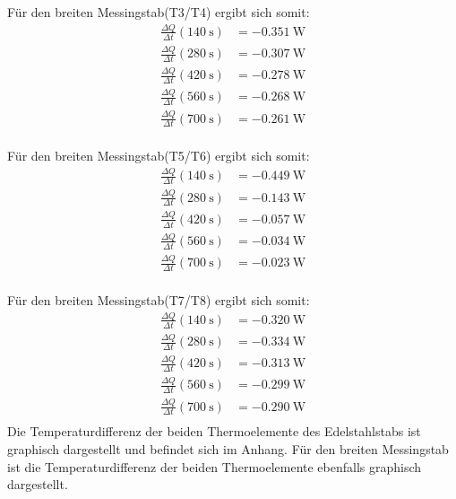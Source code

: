 Für den breiten Messingstab(T3/T4) ergibt sich somit:
\begin{align*} %
   \frac{\Delta Q}{\Delta t}(\SI{140}{\second}) &= \SI{-0.351}{\watt} \\ 
   \frac{\Delta Q}{\Delta t}(\SI{280}{\second}) &= \SI{-0.307}{\watt} \\ 
   \frac{\Delta Q}{\Delta t}(\SI{420}{\second}) &= \SI{-0.278}{\watt} \\ 
   \frac{\Delta Q}{\Delta t}(\SI{560}{\second}) &= \SI{-0.268}{\watt} \\ 
   \frac{\Delta Q}{\Delta t}(\SI{700}{\second}) &= \SI{-0.261}{\watt} \\ 
\end{align*}

Für den breiten Messingstab(T5/T6) ergibt sich somit:
\begin{align*} %
   \frac{\Delta Q}{\Delta t}(\SI{140}{\second}) &= \SI{-0.449}{\watt} \\ 
   \frac{\Delta Q}{\Delta t}(\SI{280}{\second}) &= \SI{-0.143}{\watt} \\ 
   \frac{\Delta Q}{\Delta t}(\SI{420}{\second}) &= \SI{-0.057}{\watt} \\ 
   \frac{\Delta Q}{\Delta t}(\SI{560}{\second}) &= \SI{-0.034}{\watt} \\ 
   \frac{\Delta Q}{\Delta t}(\SI{700}{\second}) &= \SI{-0.023}{\watt} \\ 
\end{align*}

Für den breiten Messingstab(T7/T8) ergibt sich somit:
\begin{align*} %
   \frac{\Delta Q}{\Delta t}(\SI{140}{\second}) &= \SI{-0.320}{\watt} \\ 
   \frac{\Delta Q}{\Delta t}(\SI{280}{\second}) &= \SI{-0.334}{\watt} \\ 
   \frac{\Delta Q}{\Delta t}(\SI{420}{\second}) &= \SI{-0.313}{\watt} \\ 
   \frac{\Delta Q}{\Delta t}(\SI{560}{\second}) &= \SI{-0.299}{\watt} \\ 
   \frac{\Delta Q}{\Delta t}(\SI{700}{\second}) &= \SI{-0.290}{\watt} \\ 
\end{align*}
\newline
Die Temperaturdifferenz der beiden Thermoelemente des Edelstahlstabs
ist graphisch dargestellt und befindet sich im Anhang. %
Für den breiten Messingstab ist die Temperaturdifferenz der beiden
Thermoelemente ebenfalls graphisch dargestellt. %

